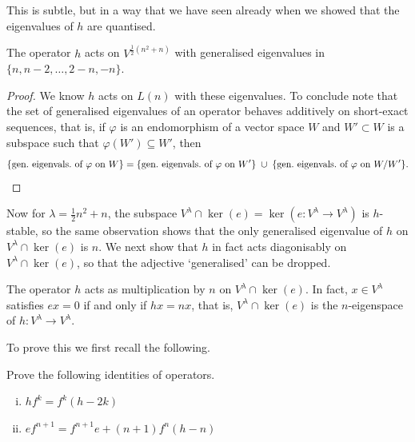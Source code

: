 This is subtle, but in a way that we have seen already when we showed that the
eigenvalues of $h$ are quantised.

\begin{proposition}
    The operator $h$ acts on $V^{\frac{1}{2}(n^2+n)}$  with generalised
    eigenvalues in $\{n,n-2,\ldots,2-n, -n\}$.

    \begin{proof}
        We know $h$ acts on $L(n)$ with these eigenvalues. To conclude note that
        the set of generalised eigenvalues of an operator behaves additively on
        short-exact sequences, that is, if $\varphi$ is an endomorphism of a
        vector space $W$ and $W'\subset W$ is a subspace such that
        $\varphi(W')\subseteq W'$, then 
        \[ 
            \{\text{gen.\ eigenvals.\ of }\varphi \text{ on }W\} 
            = \{\text{gen.\ eigenvals.\ of }\varphi \text{ on }W'\} 
            \;\cup\; \{\text{gen.\ eigenvals.\ of }\varphi \text{ on }W/W'\}. 
            \qedhere
        \]
    \end{proof}
\end{proposition}

Now for $\lambda=\frac{1}{2}n^2+n$, the subspace $V^\lambda\cap
\ker(e)=\ker(e\colon V^\lambda\to V^\lambda)$ is $h$-stable, so the same
observation shows that the only generalised eigenvalue of $h$ on $V^\lambda\cap
\ker(e)$ is $n$. We next show that $h$ in fact acts diagonisably on $V^\lambda
\cap \ker(e)$, so that the adjective `generalised' can be dropped.

\begin{proposition}\label{prop:h-acts-on-kere}
    The operator $h$ acts as multiplication by $n$ on $V^\lambda\cap \ker(e)$.
    In fact, $x\in V^\lambda$ satisfies $ex=0$ if and only if $hx=nx$, that is,
    $V^\lambda\cap \ker(e)$ is the $n$-eigenspace of $h\colon V^\lambda\to V^\lambda$.
\end{proposition}

To prove this we first recall the following. 

\begin{exercise}
    Prove the following identities of operators.
    \begin{enumerate}[(i)]
        \item $h f^k = f^k(h-2k)$
        \item $ef^{n+1} = f^{n+1}e + (n+1) f^n (h-n)$
    \end{enumerate}
\end{exercise}

